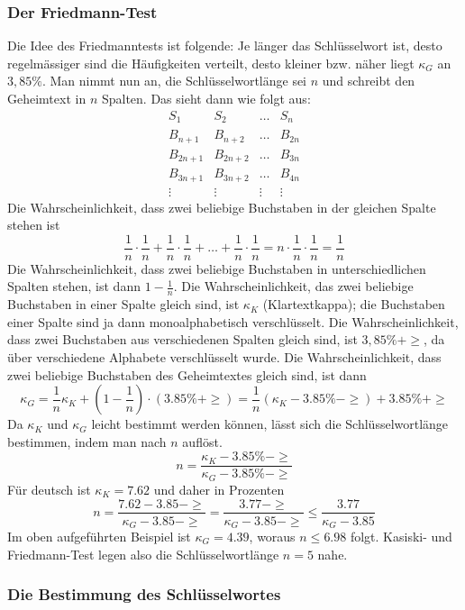 \documentclass[%
11pt,%
twoside,%
titlepage,%
german,%
headsepline%
]{scrartcl}
\begin{document}
\subsubsection{Der Friedmann-Test}

Die Idee des Friedmanntests ist folgende: Je länger das Schlüsselwort ist, desto regelmässiger sind die Häufigkeiten verteilt, desto kleiner bzw. näher liegt $\kappa_G$ an $3,85\%$.
Man nimmt nun an, die Schlüsselwortlänge sei $n$ und schreibt den Geheimtext in $n$ Spalten. Das sieht dann wie folgt aus:
$$
\begin{matrix}
S_{1\phantom{x+1}} & S_{2\phantom{x+1}} & \dots & S_{n\phantom{1}}\\
B_{n+1\phantom{1}} & B_{n+2\phantom{1}} & \dots & B_{2n}\\
B_{2n+1} & B_{2n+2} & \dots & B_{3n}\\
B_{3n+1} & B_{3n+2} & \dots & B_{4n}\\
\vdots & \vdots & \vdots & \vdots
\end{matrix}
$$
Die Wahrscheinlichkeit, dass zwei beliebige Buchstaben in der gleichen Spalte stehen ist
$$\frac{1}{n}\cdot\frac{1}{n}+\frac{1}{n}\cdot\frac{1}{n}+\dots+\frac{1}{n}\cdot\frac{1}{n}=n\cdot\frac{1}{n}\cdot\frac{1}{n}=\frac{1}{n}$$
Die Wahrscheinlichkeit, dass zwei beliebige Buchstaben in unterschiedlichen Spalten stehen, ist dann $1-\frac{1}{n}$.
Die Wahrscheinlichkeit, das zwei beliebige Buchstaben in einer Spalte gleich sind, ist $\kappa_K$ (Klartextkappa); die Buchstaben einer Spalte sind ja dann monoalphabetisch verschlüsselt.
Die Wahrscheinlichkeit, dass zwei Buchstaben aus verschiedenen Spalten gleich sind, ist $3,85\%+\ge$, da über verschiedene Alphabete verschlüsselt wurde. Die Wahrscheinlichkeit, dass zwei beliebige Buchstaben des Geheimtextes gleich sind, ist dann
$$\kappa_G=\frac{1}{n}\kappa_K+(1-\frac{1}{n})\cdot(3.85\%+\ge)=\frac{1}{n}(\kappa_K-3.85\%-\ge)+3.85\%+\ge$$
Da $\kappa_K$ und $\kappa_G$ leicht bestimmt werden k\"onnen, lässt sich die Schlüsselwortlänge bestimmen, indem man nach $n$ auflöst.
$$n=\frac{\kappa_K-3.85\%-\ge}{\kappa_G-3.85\%-\ge}$$
Für deutsch ist $\kappa_K=7.62$ und daher in Prozenten
$$n=\frac{7.62-3.85-\ge}{\kappa_G-3.85-\ge}=\frac{3.77-\ge}{\kappa_G-3.85-\ge}\leq\frac{3.77}{\kappa_G-3.85}$$
Im oben aufgeführten Beispiel ist $\kappa_G=4.39$, woraus $n\leq6.98$ folgt.
Kasiski- und Friedmann-Test legen also die Schlüsselwortlänge $n=5$ nahe.

\subsubsection{Die Bestimmung des Schlüsselwortes}
\end{document}
